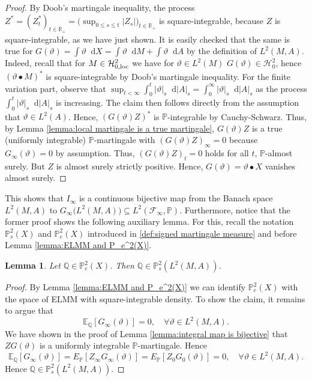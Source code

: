 \documentclass[11pt,a4paper,twoside,openany]{report}
\numberwithin{equation}{section}
\newcommand{\diff}{\mathop{}\!\mathrm{d}}
\theoremstyle{plain} %
\newtheorem{lemma}[theorem]{Lemma}
\theoremstyle{definition} %
\theoremstyle{remark} %
\begin{document}
\begin{proof}
    
          By Doob's martingale inequality, the process \(Z^*=(Z^*_t)_{t\in\mathbb{R}_+}=\big(\sup_{0\leq s\leq t}|Z_s|\big)_{t\in\mathbb{R}_+}\) is square-integrable, because \(Z\) is square-integrable, as we have just shown. It is easily checked that the same is true for \(G(\vartheta)=\int\vartheta\diff X=\int\vartheta\diff M+\int\vartheta\diff A\) by the definition of \(L^2(M,A)\). Indeed, recall that for \(M\in\mathcal{H}_{0,\rm{loc}}^2\) we have for \(\vartheta\in L^2(M)\) \(G(\vartheta)\in\mathcal{H}^2_0\), hence \((\vartheta\bullet M)^*\) is square-integrable by Doob's martingale inequality. For the finite variation part, observe that \(\sup_{t<\infty}\int_0^t|\vartheta|_s\diff |A|_s=\int_0^\infty|\vartheta|_s\diff |A|_s\) as the process \(\int_0^t|\vartheta|_s\diff |A|_s\) is increasing. The claim then follows directly from the assumption that \(\vartheta\in L^2(A)\). Hence, \((G(\vartheta)Z)^*\) is \(\mathbb{P}\)-integrable by Cauchy-Schwarz. Thus, by Lemma \ref{lemma:local martingale is a true martingale}, \(G(\vartheta)Z\) is a true (uniformly integrable) \(\mathbb{P}\)-martingale with \((G(\vartheta)Z)_{\infty}=0\) because \(G_{\infty}(\vartheta)=0\) by assumption. Thus, \((G(\vartheta)Z)_t=0\) holds for all \(t\), \(\mathbb{P}\)-almost surely. But \(Z\) is almost surely strictly positive. Hence, \(G(\vartheta)=\vartheta\bullet X\) vanishes almost surely.
\end{proof}
This shows that \(I_{\infty}\) is a continuous bijective map from the Banach space \(L^2(M,A)\) to \(G_{\infty}\big(L^2(M,A)\big)\subseteq L^2(\mathcal{F}_{\infty},\mathbb{P})\). 
Furthermore, notice that the former proof shows the following auxiliary lemma. For this, recall the notation \(\mathbb{P}_s^2(X)\) and \(\mathbb{P}_e^2(X)\) introduced in \ref{def:signed martingale measure} and before Lemma \ref{lemma:ELMM and P_e^2(X)}.
\begin{lemma}\label{lemma:P_s(Theta) in P_e(X)}
Let \(\mathbb{Q}\in \mathbb{P}_e^2(X)\). Then \(\mathbb{Q}
\in\mathbb{P}_s^2(L^2(M,A))\).
\end{lemma}
\begin{proof}
    By Lemma \ref{lemma:ELMM and P_e^2(X)} we can identify \(\mathbb{P}_e^2(X)\) with the space of ELMM with square-integrable density. To show the claim, it remains to argue that \begin{equation*}
        \mathbb{E}_{\mathbb{Q}}[G_{\infty}(\vartheta)]=0,\quad\forall \vartheta\in L^2(M,A).
    \end{equation*}
    We have shown in the proof of Lemma \ref{lemma:integral map is bijective} that \(ZG(\vartheta)\) is a uniformly integrable \(\mathbb{P}\)-martingale. Hence 
    \begin{equation*}
        \mathbb{E}_{\mathbb{Q}}[G_{\infty}(\vartheta)]=E_{\mathbb{P}}[Z_{\infty}G_{\infty}(\vartheta)]=E_{\mathbb{P}}[Z_{0}G_{0}(\vartheta)]=0,\quad\forall \vartheta\in L^2(M,A).
    \end{equation*}
    Hence \(\mathbb{Q}
\in\mathbb{P}_s^2(L^2(M,A))\).
\end{proof}
\end{document}
